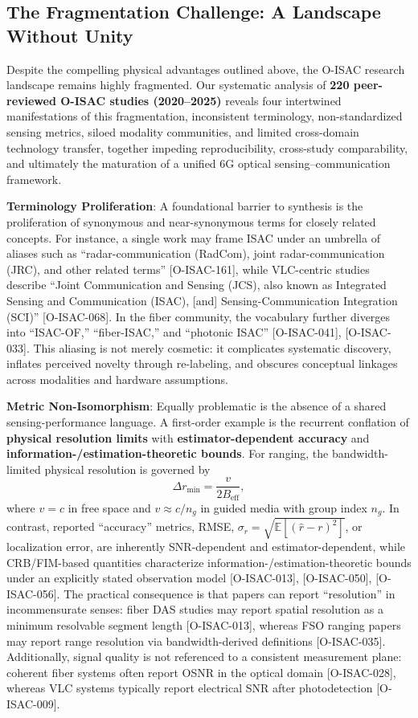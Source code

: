 \subsection{The Fragmentation Challenge: A Landscape Without Unity}

Despite the compelling physical advantages outlined above, the O-ISAC research landscape remains highly fragmented. Our systematic analysis of \textbf{220 peer-reviewed O-ISAC studies (2020--2025)} reveals four intertwined manifestations of this fragmentation, inconsistent terminology, non-standardized sensing metrics, siloed modality communities, and limited cross-domain technology transfer, together impeding reproducibility, cross-study comparability, and ultimately the maturation of a unified 6G optical sensing--communication framework.

\textbf{Terminology Proliferation}: A foundational barrier to synthesis is the proliferation of synonymous and near-synonymous terms for closely related concepts. For instance, a single work may frame ISAC under an umbrella of aliases such as ``radar-communication (RadCom), joint radar-communication (JRC), and other related terms'' [O-ISAC-161], while VLC-centric studies describe ``Joint Communication and Sensing (JCS), also known as Integrated Sensing and Communication (ISAC), [and] Sensing-Communication Integration (SCI)'' [O-ISAC-068]. In the fiber community, the vocabulary further diverges into ``ISAC-OF,'' ``fiber-ISAC,'' and ``photonic ISAC'' [O-ISAC-041], [O-ISAC-033]. This aliasing is not merely cosmetic: it complicates systematic discovery, inflates perceived novelty through re-labeling, and obscures conceptual linkages across modalities and hardware assumptions.

\textbf{Metric Non-Isomorphism}: Equally problematic is the absence of a shared sensing-performance language. A first-order example is the recurrent conflation of \textbf{physical resolution limits} with \textbf{estimator-dependent accuracy} and \textbf{information-/estimation-theoretic bounds}. For ranging, the bandwidth-limited physical resolution is governed by
\begin{equation}
\Delta r_{\min} = \frac{v}{2B_{\text{eff}}},
\end{equation}
where $v=c$ in free space and $v \approx c/n_g$ in guided media with group index $n_g$. In contrast, reported ``accuracy'' metrics, RMSE, $\sigma_r = \sqrt{\mathbb{E}[(\hat r-r)^2]}$, or localization error, are inherently SNR-dependent and estimator-dependent, while CRB/FIM-based quantities characterize information-/estimation-theoretic bounds under an explicitly stated observation model [O-ISAC-013], [O-ISAC-050], [O-ISAC-056]. The practical consequence is that papers can report ``resolution'' in incommensurate senses: fiber DAS studies may report spatial resolution as a minimum resolvable segment length [O-ISAC-013], whereas FSO ranging papers may report range resolution via bandwidth-derived definitions [O-ISAC-035]. Additionally, signal quality is not referenced to a consistent measurement plane: coherent fiber systems often report OSNR in the optical domain [O-ISAC-028], whereas VLC systems typically report electrical SNR after photodetection [O-ISAC-009].

